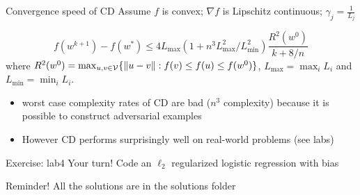 \begin{frame}{Convergence speed of CD }
    Assume $f$ is convex; $\nabla f$ is Lipschitz continuous; $\gamma_j = \frac{1}{L_j}$
    \begin{proposition}
    \[
    f(w^{k+1}) - f(w^*)
    \leq
    4 L_{\max} (1+n^3 L_{\max}^2 / L_{\min}^2 ) \frac{R^2(w^0)}{k + 8/n}
    \]
    where
    $R^2(w^0)
    =
    \max_{u, v \in \mathcal{V}} \{ \|u - v\| :
    f(v) \leq f(u) \leq f(w^0)\}$,
    $L_{\max} = \max_i L_i$
    and $L_{\min} = \min_i L_i$.
    \end{proposition}

    \begin{itemize}
        \item \alert{worst} case complexity rates of CD are bad ($n^3$ complexity) because it is possible to construct adversarial examples 
        \item However \alert{CD performs surprisingly well} on real-world problems (see labs)
    \end{itemize}
\end{frame}


\begin{frame}{Exercise: lab4}
    Your turn! Code an $\ell_2$ regularized logistic regression with bias

    \vspace{2em}

    Reminder! All the solutions are in the solutions folder
\end{frame}
